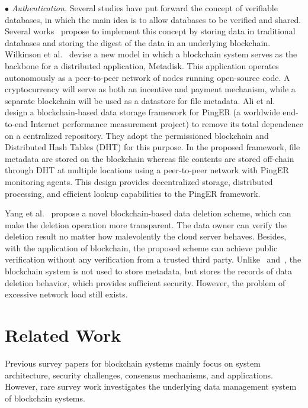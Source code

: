 \documentclass[acmsmall]{acmart}
\begin{document}
 
$\bullet$ {\it Authentication.}
Several studies have put forward the concept of verifiable databases, in which the main idea is to allow databases to be verified and shared. Several works~\cite{wilkinson2014metadisk,ali2018blockchain} propose to implement this concept by storing data in traditional databases and storing the digest of the data in an underlying blockchain. Wilkinson et al.~\cite{wilkinson2014metadisk} devise a new model in which a blockchain system serves as the backbone for a distributed application, Metadisk. This application operates autonomously as a peer-to-peer network of nodes running open-source code. A cryptocurrency will serve as both an incentive and payment mechanism, while a separate blockchain will be used as a datastore for file metadata.  Ali et al.~\cite{ali2018blockchain} design a blockchain-based data storage framework for PingER (a worldwide end-to-end Internet performance measurement project) to remove its total dependence on a centralized repository. They adopt the permissioned blockchain and Distributed Hash Tables (DHT) for this purpose. In the proposed framework, file metadata are stored on the blockchain whereas file contents are stored off-chain through DHT at multiple locations using a peer-to-peer network with PingER monitoring agents. This design provides decentralized storage, distributed processing, and efficient lookup capabilities to the PingER framework.


Yang et al.~\cite{yang2018blockchain} propose a novel blockchain-based data deletion scheme, which can make the deletion operation more transparent. The data owner can verify the deletion result no matter how malevolently the cloud server behaves. Besides, with the application of blockchain, the proposed scheme can achieve public verification without any verification from a trusted third party.
Unlike~\cite{wilkinson2014metadisk} and~\cite{ali2018blockchain}, the blockchain system is not used to store metadata, but stores the records of data deletion behavior, which provides sufficient security. However, the problem of excessive network load still exists.


\section{Related Work}
\label{sec:Related}


Previous survey papers for blockchain systems mainly focus on system architecture, security challenges, consensus mechanisms, and applications. However,  rare survey work investigates the underlying data management system of blockchain systems.
\end{document}
